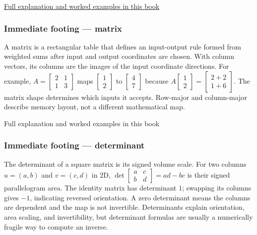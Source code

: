 \hyperref[01-foundations-i-ch017-numbers-become-a-system-of-permitted-operations]{Full explanation and worked examples in this book}

\subsubsection{Immediate footing --- matrix}\label{01-foundations-i-ch018-immediate-footing-matrix}

\hypertarget{01-foundations-i-ch018-immediate-footing-matrix}{}

A matrix is a rectangular table that defines an input-output rule formed from weighted sums after input and output coordinates are chosen. With column vectors, its columns are the images of the input coordinate directions. For example, \(A=\begin{bmatrix}2&1\\1&3\end{bmatrix}\) maps \(\begin{bmatrix}1\\2\end{bmatrix}\) to \(\begin{bmatrix}4\\7\end{bmatrix}\) because \(A\begin{bmatrix}1\\2\end{bmatrix}=\begin{bmatrix}2+2\\1+6\end{bmatrix}\). The matrix shape determines which inputs it accepts. Row-major and column-major describe memory layout, not a different mathematical map.

{Full explanation and worked examples in this book}

\subsubsection{Immediate footing --- determinant}\label{01-foundations-i-ch018-immediate-footing-determinant}

\hypertarget{01-foundations-i-ch018-immediate-footing-determinant}{}

The determinant of a square matrix is its signed volume scale. For two columns \(u=(a,b)\) and \(v=(c,d)\) in 2D, \(\det\begin{bmatrix}a&c\\b&d\end{bmatrix}=ad-bc\) is their signed parallelogram area. The identity matrix has determinant \(1\); swapping its columns gives \(-1\), indicating reversed orientation. A zero determinant means the columns are dependent and the map is not invertible. Determinants explain orientation, area scaling, and invertibility, but determinant formulas are usually a numerically fragile way to compute an inverse.

